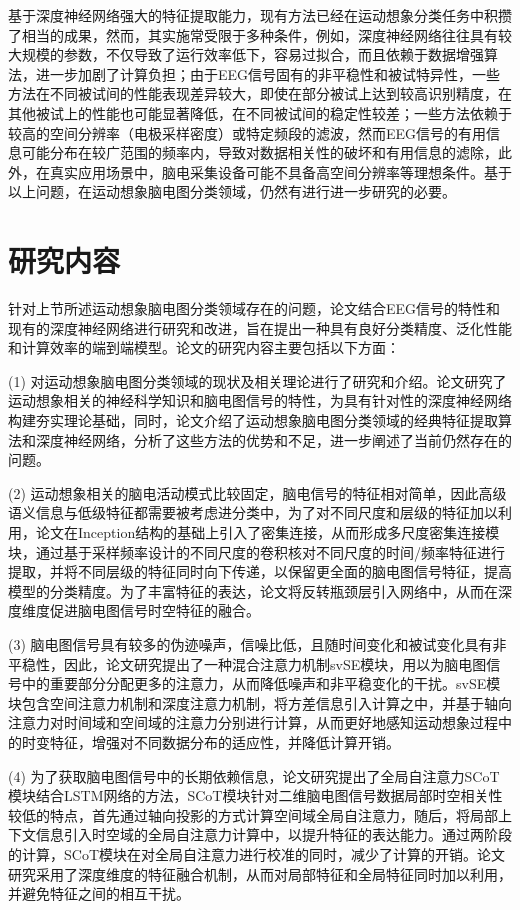 基于深度神经网络强大的特征提取能力，现有方法已经在运动想象分类任务中积攒了相当的成果，然而，其实施常受限于多种条件，例如，深度神经网络往往具有较大规模的参数，不仅导致了运行效率低下，容易过拟合，而且依赖于数据增强算法，进一步加剧了计算负担；由于EEG信号固有的非平稳性和被试特异性，一些方法在不同被试间的性能表现差异较大，即使在部分被试上达到较高识别精度，在其他被试上的性能也可能显著降低，在不同被试间的稳定性较差；一些方法依赖于较高的空间分辨率（电极采样密度）或特定频段的滤波，然而EEG信号的有用信息可能分布在较广范围的频率内，导致对数据相关性的破坏和有用信息的滤除，此外，在真实应用场景中，脑电采集设备可能不具备高空间分辨率等理想条件。基于以上问题，在运动想象脑电图分类领域，仍然有进行进一步研究的必要。

\section{研究内容}

针对上节所述运动想象脑电图分类领域存在的问题，论文结合EEG信号的特性和现有的深度神经网络进行研究和改进，旨在提出一种具有良好分类精度、泛化性能和计算效率的端到端模型。论文的研究内容主要包括以下方面：

(1) 对运动想象脑电图分类领域的现状及相关理论进行了研究和介绍。论文研究了运动想象相关的神经科学知识和脑电图信号的特性，为具有针对性的深度神经网络构建夯实理论基础，同时，论文介绍了运动想象脑电图分类领域的经典特征提取算法和深度神经网络，分析了这些方法的优势和不足，进一步阐述了当前仍然存在的问题。

(2) 运动想象相关的脑电活动模式比较固定，脑电信号的特征相对简单，因此高级语义信息与低级特征都需要被考虑进分类中，为了对不同尺度和层级的特征加以利用，论文在Inception结构的基础上引入了密集连接，从而形成多尺度密集连接模块，通过基于采样频率设计的不同尺度的卷积核对不同尺度的时间/频率特征进行提取，并将不同层级的特征同时向下传递，以保留更全面的脑电图信号特征，提高模型的分类精度。为了丰富特征的表达，论文将反转瓶颈层引入网络中，从而在深度维度促进脑电图信号时空特征的融合。

(3) 脑电图信号具有较多的伪迹噪声，信噪比低，且随时间变化和被试变化具有非平稳性，因此，论文研究提出了一种混合注意力机制svSE模块，用以为脑电图信号中的重要部分分配更多的注意力，从而降低噪声和非平稳变化的干扰。svSE模块包含空间注意力机制和深度注意力机制，将方差信息引入计算之中，并基于轴向注意力对时间域和空间域的注意力分别进行计算，从而更好地感知运动想象过程中的时变特征，增强对不同数据分布的适应性，并降低计算开销。

(4) 为了获取脑电图信号中的长期依赖信息，论文研究提出了全局自注意力SCoT模块结合LSTM网络的方法，SCoT模块针对二维脑电图信号数据局部时空相关性较低的特点，首先通过轴向投影的方式计算空间域全局自注意力，随后，将局部上下文信息引入时空域的全局自注意力计算中，以提升特征的表达能力。通过两阶段的计算，SCoT模块在对全局自注意力进行校准的同时，减少了计算的开销。论文研究采用了深度维度的特征融合机制，从而对局部特征和全局特征同时加以利用，并避免特征之间的相互干扰。

